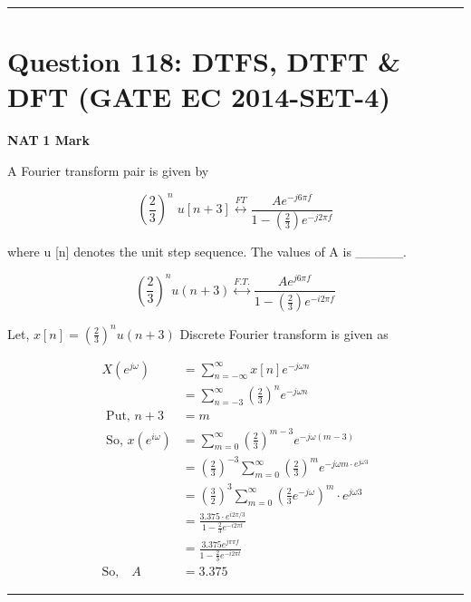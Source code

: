 \documentclass[11pt,a4paper]{article}
\begin{document}
\vspace{1.5em}
\hrule
\vspace{1.5em}

\section*{Question 118: DTFS, DTFT \& DFT (GATE EC 2014-SET-4)}
\noindent \textbf{\color{primary}NAT} \hfill \textbf{\color{secondary}1 Mark}


\noindent A Fourier transform pair is given by 
 
\[
(\frac{2}{3})^{n}  \; u[n+3]\overset{FT}{\leftrightarrow}\frac{Ae^{-j6\pi f}}{1-(\frac{2}{3})e^{-j2 \pi f}}
\]
 
 where u [n] denotes the unit step sequence. The values of A is \_\_\_\_\_.


\begin{tcolorbox}[solbox, title=Detailed Solution -- Question 118]
\[
\left(\frac{2}{3}\right)^{n} u(n+3) \stackrel{F.T.}{\longleftrightarrow} \frac{Ae^{j6\pi f}}{1-\left(\frac{2}{3}\right) e^{-i 2 \pi f}}
\]

 Let, $x[n]=\left(\frac{2}{3}\right)^{n} u(n+3)$
 Discrete Fourier transform is given as 

\[
\begin{aligned} X\left(e^{j \omega}\right)&=\sum_{n=-\infty}^{\infty} x[n] e^{-j \omega n} \\ &=\sum_{n=-3}^{\infty}\left(\frac{2}{3}\right)^{n} e^{-j \omega n} \\ \text { Put, } n+3 &=m \\ \text { So, } x\left(e^{i \omega}\right) &=\sum_{m=0}^{\infty}\left(\frac{2}{3}\right)^{m-3} e^{-j \omega(m-3)} \\ &=\left(\frac{2}{3}\right)^{-3} \sum_{m=0}^{\infty}\left(\frac{2}{3}\right)^{m} e^{-j \omega m \cdot e^{j \omega 3}} \\
&=\left(\frac{3}{2}\right)^{3} \sum_{m=0}^{\infty}\left(\frac{2}{3} e^{-j \omega}\right)^{m} \cdot e^{j \omega 3} \\
&=\frac{3.375 \cdot e^{i 2 \pi / 3}}{1-\frac{2}{3} e^{-i 2 \pi t}} \\
&=\frac{3.375 e^{j \pi \pi f}}{1-\frac{2}{3} e^{-i 2 \pi t}} \\
\text{So,}\quad A&=3.375
\end{aligned}
\]
\end{tcolorbox}

\vspace{1.5em}
\hrule
\vspace{1.5em}
\end{document}
